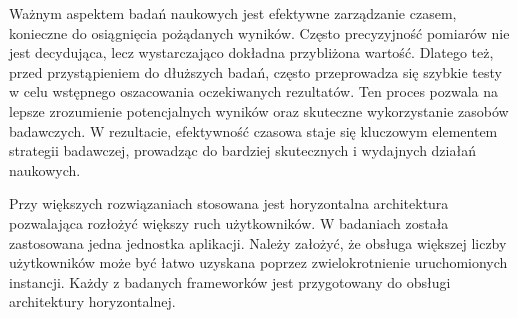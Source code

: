 Ważnym aspektem badań naukowych jest efektywne zarządzanie czasem, konieczne do osiągnięcia pożądanych wyników.
Często precyzyjność pomiarów nie jest decydująca, lecz wystarczająco dokładna przybliżona wartość.
Dlatego też, przed przystąpieniem do dłuższych badań, często przeprowadza się szybkie testy w celu wstępnego oszacowania oczekiwanych rezultatów.
Ten proces pozwala na lepsze zrozumienie potencjalnych wyników oraz skuteczne wykorzystanie zasobów badawczych.
W rezultacie, efektywność czasowa staje się kluczowym elementem strategii badawczej, prowadząc do bardziej skutecznych i wydajnych działań naukowych.

Przy większych rozwiązaniach stosowana jest horyzontalna architektura pozwalająca rozłożyć większy ruch użytkowników.
W badaniach została zastosowana jedna jednostka aplikacji.
Należy założyć, że obsługa większej liczby użytkowników może być łatwo uzyskana poprzez zwielokrotnienie uruchomionych instancji.
Każdy z badanych frameworków jest przygotowany do obsługi architektury horyzontalnej.